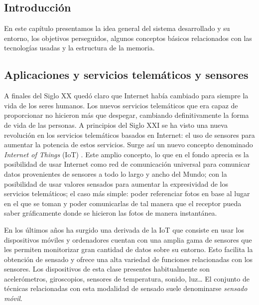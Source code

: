 \clearpage
{}%
\begin{center}
\begin{minipage}{.75\textwidth}
\section{Introducción}
En este capítulo presentamos la idea general del sistema desarrollado y su entorno, los objetivos perseguidos, algunos conceptos básicos relacionados con las tecnologías usadas y la estructura de la memoria.%
\end{minipage}
\end{center}
\clearpage%

\subsection{Aplicaciones y servicios telemáticos y sensores}

A finales del Siglo XX quedó claro que Internet había cambiado para siempre la vida de los seres humanos. Los nuevos servicios telemáticos que era capaz de proporcionar no hicieron más que despegar, cambiando definitivamente la forma de vida de las personas. A principios del Siglo XXI se ha visto una nueva revolución en los servicios telemáticos basados en Internet: el uso de sensores para aumentar la potencia de estos servicios. Surge así un nuevo concepto denominado \emph{Internet of Things} (\acrshort{IoT}) \cite{IOT2}. Este amplio concepto, lo que en el fondo aprecia es la posibilidad de usar Internet como red de comunicación universal para comunicar datos provenientes de sensores a todo lo largo y ancho del Mundo; con la posibilidad de usar valores sensados para aumentar la expresividad de los servicios telemáticos; el caso más simple: poder referenciar fotos en base al lugar en el que se toman y poder comunicarlas de tal manera que el receptor pueda saber gráficamente donde se hicieron las fotos de manera instantánea.

En los últimos años ha surgido una derivada de la IoT que consiste en usar los dispositivos móviles y ordenadores cuentan con una amplia gama de sensores que les permiten monitorizar gran cantidad de datos sobre su entorno. Esto facilita la obtención de sensado y ofrece una alta variedad de funciones relacionadas con los sensores. Los dispositivos de esta clase presentes habitualmente son acelerómetros, giroscopios, sensores de temperatura, sonido, luz… El conjunto de técnicas relacionadas con esta modalidad de sensado suele denominarse \emph{sensado móvil}.

